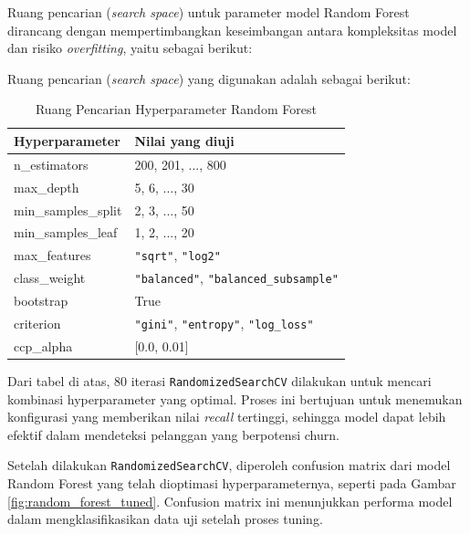 Ruang pencarian (\textit{search space}) untuk parameter model Random Forest dirancang dengan mempertimbangkan keseimbangan antara kompleksitas model dan risiko \textit{overfitting}, yaitu sebagai berikut:

Ruang pencarian (\textit{search space}) yang digunakan adalah sebagai berikut:

\begin{table}[H]
    \centering
    \caption{Ruang Pencarian Hyperparameter Random Forest}
    \label{tab:search_space_random_forest}
    \begin{tabular}{|l|l|}
        \hline
        \textbf{Hyperparameter} & \textbf{Nilai yang diuji} \\ \hline
        n\_estimators & 200, 201, ..., 800 \\ \hline
        max\_depth & 5, 6, ..., 30 \\ \hline
        min\_samples\_split & 2, 3, ..., 50 \\ \hline
        min\_samples\_leaf & 1, 2, ..., 20 \\ \hline
        max\_features & \texttt{"sqrt"}, \texttt{"log2"} \\ \hline
        class\_weight & \texttt{"balanced"}, \texttt{"balanced\_subsample"} \\ \hline
        bootstrap & True \\ \hline
        criterion & \texttt{"gini"}, \texttt{"entropy"}, \texttt{"log\_loss"} \\ \hline
        ccp\_alpha & [0.0, 0.01] \\ \hline
    \end{tabular}
\end{table}

Dari tabel di atas, 80 iterasi \texttt{RandomizedSearchCV} dilakukan untuk mencari kombinasi hyperparameter yang optimal. Proses ini bertujuan untuk menemukan konfigurasi yang memberikan nilai \textit{recall} tertinggi, sehingga model dapat lebih efektif dalam mendeteksi pelanggan yang berpotensi churn.

Setelah dilakukan \texttt{RandomizedSearchCV}, diperoleh confusion matrix dari model Random Forest yang telah dioptimasi hyperparameternya, seperti pada Gambar \ref{fig:random_forest_tuned}. Confusion matrix ini menunjukkan performa model dalam mengklasifikasikan data uji setelah proses tuning.


